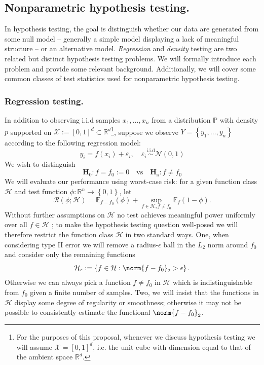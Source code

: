 \documentclass{article}
\newcommand{\Reals}{\mathbb{R}}
\newcommand{\set}[1]{\left\{#1\right\}}
\newcommand{\1}{\mathbf{1}}
\newcommand{\Ebb}{\mathbb{E}}
\theoremstyle{alden}
\theoremstyle{aldenthm}
\theoremstyle{definition}
\theoremstyle{remark}
\begin{document}
\subsection{Nonparametric hypothesis testing.}

In hypothesis testing, the goal is distinguish whether our data are generated from some null model -- generally a simple model displaying a lack of meaningful structure -- or an alternative model. \emph{Regression} and \emph{density} testing are two related but distinct hypothesis testing problems. We will formally introduce each problem and provide some relevant background. Additionally, we will cover some common classes of test statistics used for nonparametric hypothesis testing.

\subsubsection{Regression testing.}

In addition to observing i.i.d samples $x_1,\ldots,x_n$ from a distribution $\mathbb{P}$ with density $p$ supported on $\mathcal{X} := [0,1]^d \subset \Reals^d$\footnote{For the purposes of this proposal, whenever we discuss hypothesis testing we will assume $\mathcal{X} = [0,1]^d$, i.e. the unit cube with dimension equal to that of the ambient space $\Reals^d$.}, suppose we observe $Y = \set{y_1,\ldots,y_n}$ according to the following regression model:
\begin{equation}
\label{eqn:regression}
y_i = f(x_i) + \varepsilon_i, \quad \varepsilon_i \overset{\textrm{i.i.d}}{\sim} \mathcal{N}(0,1)
\end{equation}
We wish to distinguish
\begin{equation*}
\mathbf{H}_0: f = f_0 := 0 \quad \textrm{vs} \quad \mathbf{H}_{\textrm{a}}: f \neq f_0
\end{equation*}
We will evaluate our performance using worst-case risk: for a given function class $\mathcal{H}$ and test function $\phi: \Reals^n \to \set{0,1}$, let
\begin{equation*}
\mathcal{R}(\phi; \mathcal{H}) = \Ebb_{f = f_0}(\phi) + \sup_{f \in \mathcal{H}, f \neq f_0} \Ebb_f(1 - \phi).
\end{equation*}
Without further assumptions on $\mathcal{H}$ no test achieves meaningful power uniformly over all $f \in \mathcal{H}$ \citet{janssen2000}; to make the hypothesis testing question well-posed we will therefore restrict the function class $\mathcal{H}$ in two standard ways. One, when considering type II error we will remove a radius-$\epsilon$ ball in the $L_2$ norm around $f_0$ and consider only the remaining functions
\begin{equation*}
\mathcal{H}_{\epsilon} := \set{f \in \mathcal{H}:\norm{f - f_0}_2 > \epsilon}.
\end{equation*}
Otherwise we can always pick a function $f \neq f_0$ in $\mathcal{H}$ which is indistinguishable from $f_0$ given a finite number of samples. Two, we will insist that the functions in $\mathcal{H}$ display some degree of regularity or smoothness; otherwise it may not be possible to consistently estimate the functional $\norm{f - f_0}_2$. 
\end{document}
